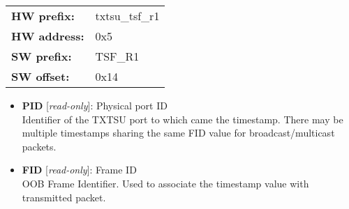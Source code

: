 \begin{tabular}{l l }
{\bf HW prefix:}  & txtsu\_tsf\_r1\\
{\bf HW address:}  & 0x5\\
{\bf SW prefix:}  & TSF\_R1\\
{\bf SW offset:}  & 0x14\\
\end{tabular}


\vspace{12pt}
\noindent
{}

\begin{itemize}
\item \begin{small}
{\bf 
PID
} [\emph{read-only}]: Physical port ID
\\
Identifier of the TXTSU port to which came the timestamp. There may be multiple timestamps sharing the same FID value for broadcast/multicast packets.
\end{small}
\item \begin{small}
{\bf 
FID
} [\emph{read-only}]: Frame ID
\\
OOB Frame Identifier. Used to associate the timestamp value with transmitted packet.
\end{small}
\end{itemize}
